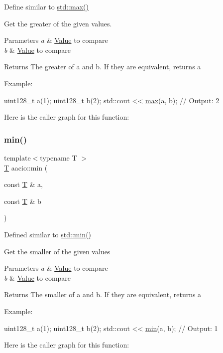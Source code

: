 Define similar to \mbox{\hyperlink{group__mathcppapi_ga1cdad1dcbc2a3d9e6c440342c9bf5769}{std\+::max()}} 

Get the greater of the given values. 
\begin{DoxyParams}{Parameters}
{\em a} & \mbox{\hyperlink{struct_value}{Value}} to compare \\
\hline
{\em b} & \mbox{\hyperlink{struct_value}{Value}} to compare \\
\hline
\end{DoxyParams}
\begin{DoxyReturn}{Returns}
The greater of a and b. If they are equivalent, returns a
\end{DoxyReturn}
Example\+: 
\begin{DoxyCode}
uint128\_t a(1);
uint128\_t b(2);
std::cout << \mbox{\hyperlink{group__mathcppapi_ga1cdad1dcbc2a3d9e6c440342c9bf5769}{max}}(a, b); \textcolor{comment}{// Output: 2}
\end{DoxyCode}
 Here is the caller graph for this function\+:
\mbox{\label{group__mathcppapi_gab64c39815d220956e9d2d3c01436e7bc}} 
\subsubsection{\texorpdfstring{min()}{min()}}
{\footnotesize\ttfamily template$<$typename T $>$ \\
\mbox{\hyperlink{struct_t}{T}} aacio\+::min (\begin{DoxyParamCaption}\item[{const \mbox{\hyperlink{struct_t}{T}} \&}]{a,  }\item[{const \mbox{\hyperlink{struct_t}{T}} \&}]{b }\end{DoxyParamCaption})}



Defined similar to \mbox{\hyperlink{group__mathcppapi_gab64c39815d220956e9d2d3c01436e7bc}{std\+::min()}} 

Get the smaller of the given values 
\begin{DoxyParams}{Parameters}
{\em a} & \mbox{\hyperlink{struct_value}{Value}} to compare \\
\hline
{\em b} & \mbox{\hyperlink{struct_value}{Value}} to compare \\
\hline
\end{DoxyParams}
\begin{DoxyReturn}{Returns}
The smaller of a and b. If they are equivalent, returns a
\end{DoxyReturn}
Example\+: 
\begin{DoxyCode}
uint128\_t a(1);
uint128\_t b(2);
std::cout << \mbox{\hyperlink{group__mathcppapi_gab64c39815d220956e9d2d3c01436e7bc}{min}}(a, b); \textcolor{comment}{// Output: 1}
\end{DoxyCode}
 Here is the caller graph for this function\+:
\mbox{\label{group__mathcppapi_gac2619557a323e4fdb5f2b69a345573e2}} 
